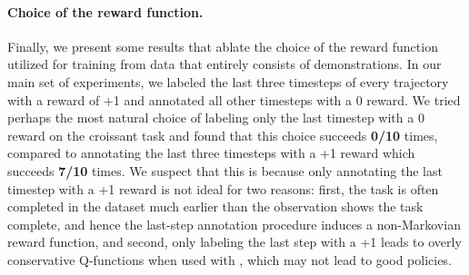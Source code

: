 \documentclass[../thesis.tex]{subfiles}
\begin{document}
\begin{table}
\centering
{}
\vspace{0.1cm}
\caption{\footnotesize{\textbf{Relative performance of \ptrmethodname with batch normalization with respect to \ptrmethodname with group normalization.} Observe that while utilizing batch normalization in \ptrmethodname can be sometimes more effective than using group normalization (e.g., take croissant out of metallic bowl task), it may also be highly ineffective and can reduce success rates significantly in other tasks. The performance numbers to the left of the $\rightarrow$ correspond to the performance of \ptrmethodname with group normalization and the performance to the right of $\rightarrow$ is the performance with batch normalization.}}
\label{tab:batch_norm}
\end{table}


\paragraph{Choice of the reward function.} Finally, we present some results that ablate the choice of the reward function utilized for training \ptrmethodname from data that entirely consists of demonstrations. In our main set of experiments, we labeled the last three timesteps of every trajectory with a reward of +1 and annotated all other timesteps with a 0 reward. We tried perhaps the most natural choice of labeling only the last timestep with a 0 reward on the croissant task and found that this choice succeeds \textbf{0/10} times, compared to annotating the last three timesteps with a +1 reward which succeeds \textbf{7/10} times. We suspect that this is because only annotating the last timestep with a +1 reward is not ideal for two reasons: first, the task is often completed in the dataset much earlier than the observation shows the task complete, and hence the last-step annotation procedure induces a non-Markovian reward function, and second, only labeling the last step with a +1 leads to overly conservative Q-functions when used with \ptrmethodname, which may not lead to good policies.
\end{document}
